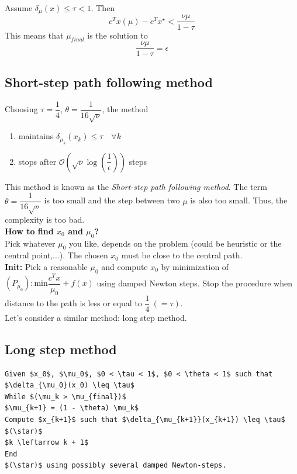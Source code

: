 \begin{theorem}
Assume $\delta_{\mu}(x) \leq \tau < 1$. Then
$$c^T x(\mu) - c^T x^{\star} < \frac{\nu\mu}{1 - \tau}$$
This means that $\mu_{final}$ is the solution to
$$\frac{\nu\mu}{1 - \tau} = \epsilon$$
\end{theorem}

\subsection{Short-step path following method}

\begin{theorem}
Choosing $\tau = \dfrac{1}{4}$, $\theta = \dfrac{1}{16 \sqrt{\nu}}$, the method 
\begin{enumerate}
\item maintains $\delta_{\mu_k}(x_k) \leq \tau \quad \forall k$ 
\item stops after $\mathcal{O}(\sqrt{\nu} \log(\dfrac{1}{\epsilon}))$ steps
\end{enumerate}
\end{theorem}

This method is known as the \textit{Short-step path following method}. The term $\theta = \dfrac{1}{16 \sqrt{\nu}}$ is too small and the step between two $\mu$ is also too small. Thus, the complexity is too bad.\\

\textbf{How to find $x_0$ and $\mu_0$?}\\
Pick whatever $\mu_0$ you like, depends on the problem (could be heuristic or the central point,...). The chosen $x_0$ must be close to the central path.\\
\textbf{Init:} Pick a reasonable $\mu_0$ and compute $x_0$ by minimization of $(P_{\mu_0}):  \text{min} \dfrac{c^T x}{\mu_0} + f(x)$ using damped Newton steps. Stop the procedure when distance to the path is less or equal to $\dfrac{1}{4}\ (=\tau)$.\\
Let's consider a similar method: long step method.

\subsection{Long step method}

\begin{lstlisting}[mathescape,caption=Long step method]
Given $x_0$, $\mu_0$, $0 < \tau < 1$, $0 < \theta < 1$ such that $\delta_{\mu_0}(x_0) \leq \tau$
While $(\mu_k > \mu_{final})$
$\mu_{k+1} = (1 - \theta) \mu_k$ 
Compute $x_{k+1}$ such that $\delta_{\mu_{k+1}}(x_{k+1}) \leq \tau$ $(\star)$
$k \leftarrow k + 1$
End
$(\star)$ using possibly several damped Newton-steps. 
\end{lstlisting}

